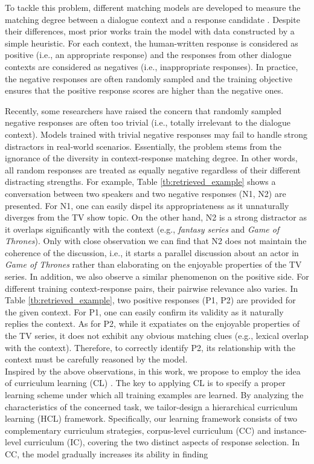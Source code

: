 \documentclass[11pt,a4paper]{article}
\begin{document}
To tackle this problem, different matching models are developed to measure the matching degree between a dialogue
context and a response candidate \cite{DBLP:conf/acl/WuWXZL17,DBLP:conf/acl/WuLCZDYZL18,DBLP:conf/acl/LuZXLZX19,DBLP:conf/cikm/GuLL19}. Despite their differences, most prior works train the model with data constructed by a simple heuristic. For each context, the human-written response is considered as positive (i.e., an appropriate response) and the responses from other dialogue contexts are considered as negatives (i.e., inappropriate responses). In practice, the negative responses are often randomly sampled and the training objective ensures that the positive response scores are higher than the negative ones.

Recently, some researchers \cite{li-etal-2019-sampling,lin2020world} have raised the concern that randomly sampled negative responses are often too trivial (i.e., totally irrelevant to the dialogue context). Models trained with trivial negative responses may fail to handle strong distractors in real-world scenarios. Essentially, the problem stems from the ignorance of the diversity in context-response matching degree. In other words, all random responses are treated as equally negative regardless of their different distracting strengths. For example, Table \ref{tb:retrieved_example} shows a conversation between two speakers and two negative responses (N1, N2) are presented. For N1, one can easily dispel its appropriateness as it unnaturally diverges from the TV show topic. On the other hand, N2 is a strong distractor as it overlaps significantly with the context (e.g., \textit{fantasy series} and \textit{Game of Thrones}). Only with close observation we can find that N2 does not maintain the coherence of the discussion, i.e., it starts a parallel discussion about an actor in \textit{Game of Thrones} rather than elaborating on the enjoyable properties of the TV series. In addition, we also observe a similar phenomenon on the positive side. For different training context-response pairs, their pairwise relevance also varies. In Table \ref{tb:retrieved_example}, two positive responses (P1, P2) are provided for the given context. For P1, one can easily confirm its validity as it naturally replies the context. As for P2, while it expatiates on the enjoyable properties of the TV series, it does not exhibit any obvious matching clues (e.g., lexical overlap with the context). Therefore, to correctly identify P2, its relationship with the context must be carefully reasoned by the model. \\\indent Inspired by the above observations, in this work, we propose to employ the idea of curriculum learning (CL) \cite{DBLP:conf/icml/BengioLCW09}. The key to applying CL is to specify a proper learning scheme under which all training examples are learned. By analyzing the characteristics of the concerned task, we tailor-design a hierarchical curriculum learning (HCL) framework. Specifically, our learning framework consists of two complementary curriculum strategies, corpus-level curriculum (CC) and instance-level curriculum (IC), covering the two distinct aspects of response selection. In CC, the model gradually increases its ability in finding 
\end{document}
